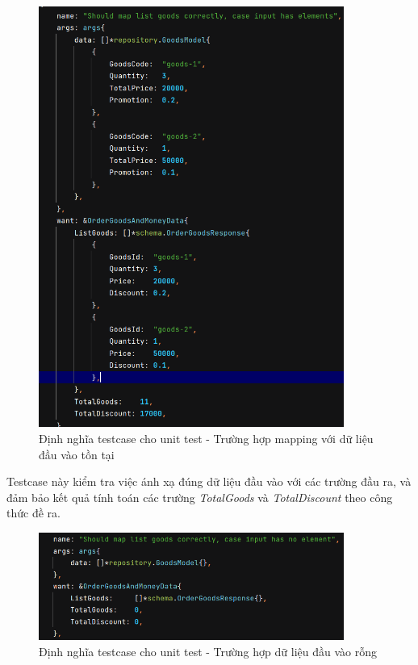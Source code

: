 \begin{figure}[!htp]
	\begin{center}
		\includegraphics[width=10cm]{img/testing/unit_tc1.PNG}
	\end{center}
	\caption{Định nghĩa testcase cho unit test - Trường hợp mapping với dữ liệu đầu vào tồn tại}
\end{figure}

Testcase này kiểm tra việc ánh xạ đúng dữ liệu đầu vào với các trường đầu ra, và đảm bảo kết quả tính toán các trường \emph{TotalGoods} và \emph{TotalDiscount} theo công thức đề ra.\\
\newpage

\begin{figure}[!htp]
	\begin{center}
		\includegraphics[width=10cm]{img/testing/unit_tc2.PNG}
	\end{center}
	\caption{Định nghĩa testcase cho unit test - Trường hợp dữ liệu đầu vào rỗng}
\end{figure}

